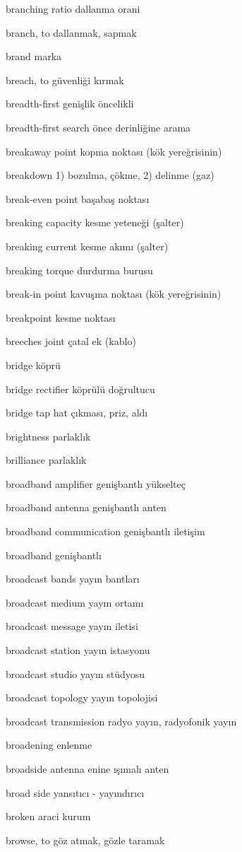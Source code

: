 \documentclass[12pt,fleqn]{article}\usepackage{../../common}
\begin{document}
branching ratio dallanma orani

branch, to dallanmak, sapmak

brand marka

breach, to güvenliği kırmak

breadth-first genişlik öncelikli

breadth-first search önce derinliğine arama

breakaway point kopma noktası (kök yereğrisinin)

breakdown 1) bozulma, çökme, 2) delinme (gaz)

break-even point başabaş noktası

breaking capacity kesme yeteneği (şalter)

breaking current kesme akımı (şalter)

breaking torque durdurma burusu

break-in point kavuşma noktası (kök yereğrisinin)

breakpoint kesme noktası

breeches joint çatal ek (kablo)

bridge köprü

bridge rectifier köprülü doğrultucu

bridge tap hat çıkması, priz, aldı

brightness parlaklık

brilliance parlaklık

broadband amplifier genişbantlı yükselteç

broadband antenna genişbantlı anten

broadband communication genişbantlı iletişim

broadband genişbantlı

broadcast bands yayın bantları

broadcast medium yayın ortamı

broadcast message yayın iletisi

broadcast station yayın istasyonu

broadcast studio yayın stüdyosu

broadcast topology yayın topolojisi

broadcast transmission radyo yayın, radyofonik yayın

broadening enlenme

broadside antenna enine ışımalı anten

broad side yansıtıcı - yayındırıcı

broken araci kurum

browse, to göz atmak, gözle taramak
\end{document}

